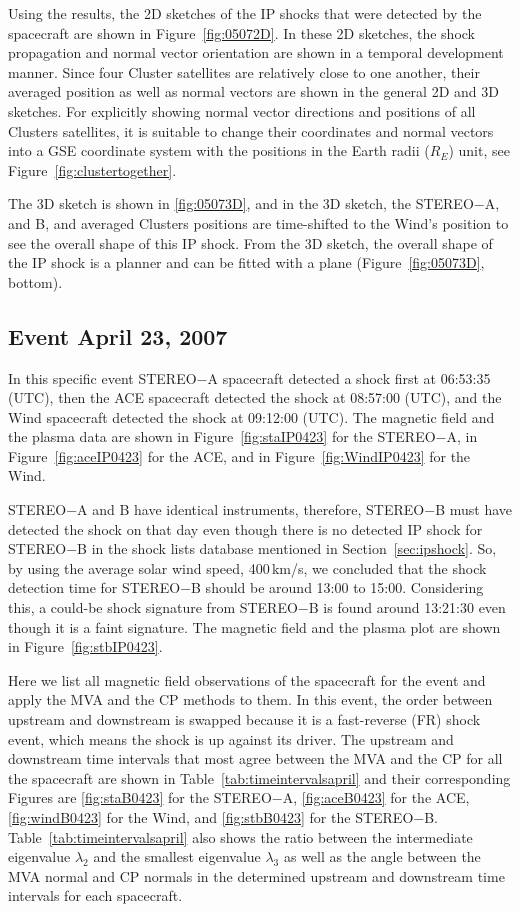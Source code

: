 \documentclass[draft]{agujournal2019}
\begin{document}
Using the results, the 2D sketches of the IP shocks that were detected by the spacecraft are shown in Figure~\ref{fig:05072D}. In these 2D sketches, the shock propagation and normal vector orientation are shown in a temporal development manner. Since four Cluster satellites are relatively close to one another, their averaged position as well as normal vectors are shown in the general 2D and 3D sketches. For explicitly showing normal vector directions and positions of all Clusters satellites, it is suitable to change their coordinates and normal vectors into a GSE coordinate system with the positions in the Earth radii ($R_{E}$) unit, see Figure~\ref{fig:clustertogether}.

The 3D sketch is shown in \ref{fig:05073D}, and in the 3D sketch, the STEREO$-$A, and B, and averaged Clusters positions are time-shifted to the Wind's position to see the overall shape of this IP shock. From the 3D sketch, the overall shape of the IP shock is a planner and can be fitted with a plane (Figure~\ref{fig:05073D}, bottom). 


\subsection{Event April 23, 2007}
\label{sec:event20070423}

In this specific event STEREO$-$A spacecraft detected a shock first at 06:53:35 (UTC), then the ACE spacecraft detected the shock at 08:57:00 (UTC), and the Wind spacecraft detected the shock at 09:12:00 (UTC). The magnetic field and the plasma data are shown in Figure~\ref{fig:staIP0423} for the STEREO$-$A, in Figure~\ref{fig:aceIP0423} for the ACE, and in Figure~\ref{fig:WindIP0423} for the Wind. 

STEREO$-$A and B have identical instruments, therefore, STEREO$-$B must have detected the shock on that day even though there is no detected IP shock for STEREO$-$B in the shock lists database mentioned in Section~\ref{sec:ipshock}. So, by using the average solar wind speed, 400\,km/s, we concluded that the shock detection time for STEREO$-$B should be around 13:00 to 15:00. Considering this, a could-be shock signature from STEREO$-$B is found around 13:21:30 even though it is a faint signature. The magnetic field and the plasma plot are shown in Figure~\ref{fig:stbIP0423}.

Here we list all magnetic field observations of the spacecraft for the event and apply the MVA and the CP methods to them. In this event, the order between upstream and downstream is swapped because it is a fast-reverse (FR) shock event, which means the shock is up against its driver. The upstream and downstream time intervals that most agree between the MVA and the CP for all the spacecraft are shown in Table~\ref{tab:timeintervalsapril} and their corresponding Figures are \ref{fig:staB0423} for the STEREO$-$A, \ref{fig:aceB0423} for the ACE, \ref{fig:windB0423} for the Wind, and \ref{fig:stbB0423} for the STEREO$-$B. Table~\ref{tab:timeintervalsapril} also shows the ratio between the intermediate eigenvalue $\lambda_{2}$ and the smallest eigenvalue $\lambda_{3}$ as well as the angle between the MVA normal and CP normals in the determined upstream and downstream time intervals for each spacecraft. 
\end{document}
